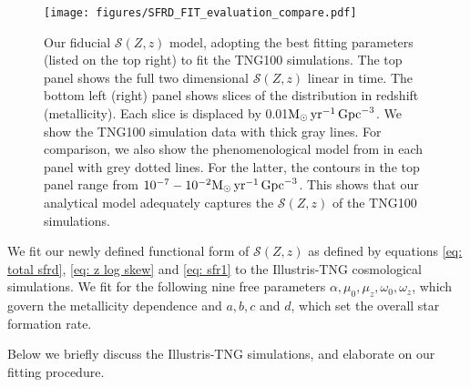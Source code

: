 \documentclass[twocolumn]{aastex631}
\newcommand{\Msun}{\ensuremath{\rm{M}_{\odot}}\xspace}
\newcommand{\yr}{\ensuremath{\,\rm{yr}}\xspace}
\newcommand{\Mpc}{\ensuremath{\,\rm{Gpc}}\xspace}
\newcommand{\SFRDzZ}{\ensuremath{\mathcal{S}(Z,z)}\xspace}
\begin{document}
\begin{figure*}
\centering
{}
\texttt{[image: figures/SFRD\_FIT\_evaluation\_compare.pdf]}
\caption{Our fiducial \SFRDzZ model, adopting the best fitting parameters (listed on the top right) to fit the TNG100 simulations.
The top panel shows the full two dimensional \SFRDzZ linear in time. The bottom left (right) panel shows slices of the distribution in redshift (metallicity). Each slice is displaced by 0.01$\Msun \yr^{-1}\Mpc^{-3}$. We show the TNG100 simulation data with thick gray lines. 
For comparison, we also show the phenomenological model from \protect\cite{Neijssel+2019} in each panel with grey dotted lines. For the latter, the contours in the top panel range from $10^{-7} - 10^{-2} \Msun \yr^{-1}\Mpc^{-3}$. This shows that our analytical model adequately captures the \SFRDzZ of the TNG100 simulations.
 \label{fig: fit SFRD}}
\end{figure*}
We fit our newly defined functional form of \SFRDzZ as defined by equations \ref{eq: total sfrd}, \ref{eq: z log skew} and \ref{eq: sfr1} to the Illustris-TNG cosmological simulations. 
We fit for the following nine free parameters $\alpha, \mu_0, \mu_z, \omega_0, \omega_z$, which govern the metallicity dependence and $a,b, c$ and $d$, which set the overall star formation rate.

Below we briefly discuss the Illustris-TNG simulations, and elaborate on our fitting procedure.

\end{document}
